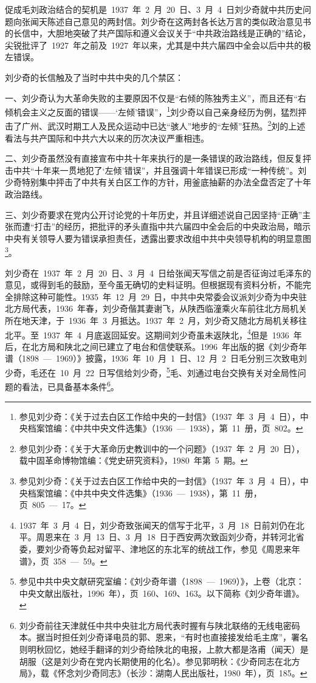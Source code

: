促成毛刘政治结合的契机是~1937~年~2~月~20~日、3~月~4~日刘少奇就中共历史问题向张闻天陈述自己意见的两封信。刘少奇在这两封各长达万言的类似政治意见书的长信中，大胆地突破了共产国际和遵义会议关于“中共政治路线是正确的”结论，尖锐批评了~1927~年之前及~1927~年以来，尤其是中共六届四中全会以后中共的极左错误。

刘少奇的长信触及了当时中共中央的几个禁区：

一、刘少奇认为大革命失败的主要原因不仅是“右倾的陈独秀主义”，而且还有“右倾机会主义之反面的错误——‘左倾’错误”，\footnote{参见刘少奇：《关于过去白区工作给中央的一封信》（1937~年~3~月~4~日），中央档案馆编：《中共中央文件选集》（1936~—~1938），第~11~册，页~802。}刘少奇以自己亲身经历为例，猛烈抨击了广州、武汉时期工人及民众运动中已达“骇人”地步的“左倾”狂热。\footnote{参见刘少奇：《关于大革命历史教训中的一个问题》（1937~年~2~月~20~日），载中固革命博物馆编：《党史研究资料》，1980~年第~5~期。}刘的上述看法与共产国际和中共六大以来的历次决议严重相违。

二、刘少奇虽然没有直接宣布中共十年来执行的是一条错误的政治路线，但反复抨击中共“十年来一贯地犯了‘左倾’错误”，并且强调十年错误已形成“一种传统”。刘少奇特别集中抨击了中共有关白区工作的方针，用釜底抽薪的办法全盘否定了十年政治路线。

三、刘少奇要求在党内公开讨论党的十年历史，并且详细述说自己因坚持“正确”主张而遭“打击”的经历，把批评的矛头直指中共六届四中全会后的中央政治局，暗示中央有关领导人要为错误承担责任，透露出要求改组中共中央领导机构的明显意图\footnote{参见刘少奇：《关于过去白区工作给中央的一封信》（1937~年~3~月~4~日），中央档案馆编：《中共中央文件选集》（1936~—~1938），第~11~册，页~805~—~17。}。

刘少奇在~1937~年~2~月~20~日、3~月~4~日给张闻天写信之前是否征询过毛泽东的意见，或得到毛的鼓励，至今虽无确切的史料证明。但根据现有资料分析，不能完全排除这种可能性。1935~年~12~月~29~日，中共中央常委会议派刘少奇为中央驻北方局代表，1936~年春，刘少奇偕其妻谢飞，从陕西临潼乘火车前往北方局机关所在地天津，于~1936~年~3~月抵达。1937~年~2~月，刘少奇又随北方局机关移往北平。至~1937~年~4~月底返回延安。这期间刘少奇虽未返陕北，\footnote{1937~年~3~月~4~日，刘少奇致张闻天的信写于北平，3~月~18~日前刘仍在北平。周恩来在~3~月~13~日、3~月~18~日于西安两次致函刘少奇，并转河北省委，要刘少奇等负起对留平、津地区的东北军的统战工作，参见《周恩来年谱》，页~358~—~59。}但是~1936~年后，在北方局和陕北之间已建立了电台和信使联系。1996~年出版的据《刘少奇年谱（1898~—~1969）》披露，1936~年~10~月~1~日、12~月~2~日毛分别三次致电刘少奇，毛还在~10~月~22~日写信给刘少奇，\footnote{参见中共中央文献研究室编：《刘少奇年谱（1898~—~1969）》，上卷（北京：中央文献出版社，1996~年），页~160、169、163。以下简称《刘少奇年谱》。}毛、刘通过电台交换有关对全局性问题的看法，已具备基本条件\footnote{刘少奇前往天津就任中共中央驻北方局代表时握有与陕北联络的无线电密码本。据当时担任刘少奇译电员的郭、恩来，“有时也直接接发给毛主席”，署名则明秋回忆，她经手翻译的刘少奇给陕北的电报，上款大都是洛甫（闻天）是胡服（这是刘少奇在党内长期使用的化名）。参见郭明秋：《少奇同志在北方局》，载《怀念刘少奇同志》（长沙：湖南人民出版社，1980~年），页~185。}。


